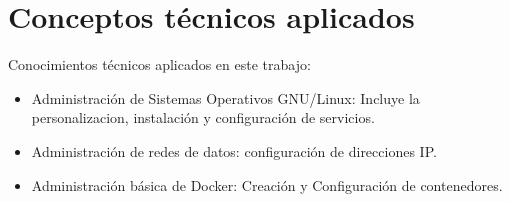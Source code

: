 \chapter{Conceptos técnicos aplicados}\label{cap:conceptos}


	Conocimientos técnicos aplicados en este trabajo:

	\begin{itemize}

		\item Administración de Sistemas Operativos GNU/Linux: Incluye la personalizacion, instalación y configuración de servicios.

		\item Administración de redes de datos: configuración de direcciones IP.

		\item Administración básica de Docker: Creación y Configuración de contenedores.

	\end{itemize}
